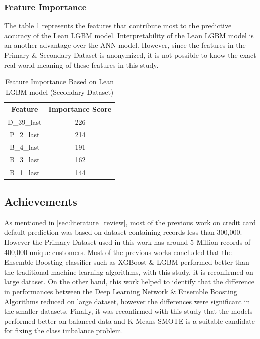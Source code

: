\documentclass[twoside,11pt,a4paper]{article}
\begin{document}
\subsubsection{Feature Importance} \label{subsec:feature_imp}
The table \ref{table:imp_features} represents the features that contribute most to the predictive accuracy of the Lean \acs{LGBM} model. Interpretability  of the Lean \acs{LGBM} model is an another advantage over the \acs{ANN} model. However, since the features in the Primary \& Secondary Dataset is anonymized, it is not possible to know the exact real world meaning of these features in this study.

\begin{table}[h]
	\begin{center}
		\begin{tabular}{|| c | c ||} 
			\hline
			Feature & Importance Score \\ [0.5ex] 
			\hline\hline
			D\_39\_last &	226 \\
			\hline
			P\_2\_last &	214 \\
			\hline
			B\_4\_last &	191 \\
			\hline
			B\_3\_last &	162 \\
			\hline
			B\_1\_last &	144 \\
			\hline
		\end{tabular}
		\caption{Feature Importance Based on Lean \acs{LGBM} model  (Secondary Dataset)}
		\label{table:imp_features}
	\end{center}
\end{table}


\subsection{Achievements}
As mentioned in \ref{sec:literature_review}, most of the previous work on credit card default prediction was based on dataset containing records less than 300,000. However the Primary Dataset used in this work has around 5 Million records of 400,000 unique customers. Most of the previous works concluded that the Ensemble Boosting classifier such as \acs{XGBoost} \& \acs{LGBM} performed better than the traditional machine learning algorithms, with this study, it is reconfirmed on large dataset. On the other hand, this work helped to identify  that the difference in performances between the Deep Learning Network \& Ensemble Boosting Algorithms reduced on large dataset, however the differences were significant in the smaller datasets. Finally, it was reconfirmed with this study that the models performed better on balanced data and  K-Means \acs{SMOTE} is a suitable candidate for fixing the class imbalance problem. 
\end{document}
